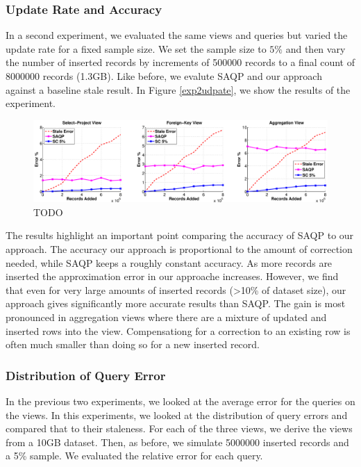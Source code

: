 \subsubsection{Update Rate and Accuracy}
In a second experiment, we evaluated the same views and queries but varied the update rate for a fixed sample size.
We set the sample size to $5\%$ and then vary the number of inserted records by increments of 500000 records to a final count of 8000000 records (1.3GB).
Like before, we evalute SAQP and our approach against a baseline stale result.
In Figure \ref{exp2udpate}, we show the results of the experiment. 

\begin{figure}[ht!]
\label{exp2update}
\centering
 \includegraphics[width=\textwidth]{exp/exp2-updatesize-accuracy.eps}
 \caption{TODO}
\end{figure}

The results highlight an important point comparing the accuracy of SAQP to our approach. 
The accuracy our approach is proportional to the amount of correction needed, while SAQP keeps a roughly constant accuracy.
As more records are inserted the approximation error in our approache increases.
However, we find that even for very large amounts of inserted records (>10\% of dataset size), our approach gives significantly more accurate results
than SAQP.
The gain is most pronounced in aggregation views where there are a mixture of updated and inserted rows into the view.
Compensationg for a correction to an existing row is often much smaller than doing so for a new inserted record.

\subsubsection{Distribution of Query Error}
In the previous two experiments, we looked at the average error for the queries on the views.
In this experiments, we looked at the distribution of query errors and compared that to their staleness.
For each of the three views, we derive the views from a 10GB dataset.
Then, as before, we simulate 5000000 inserted records and a 5\% sample.
We evaluated the relative error for each query.

